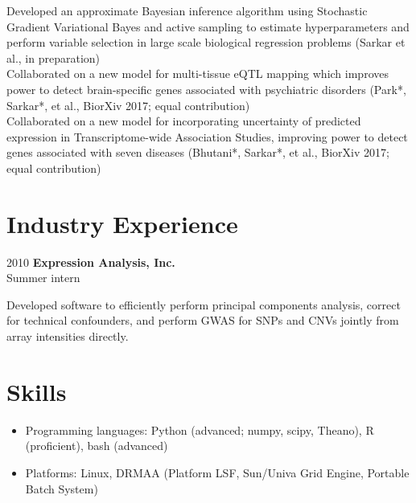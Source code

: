 \documentclass{article}
\begin{document}
Developed an approximate Bayesian inference algorithm using Stochastic
Gradient Variational Bayes and active sampling to estimate hyperparameters
and perform variable selection in large scale biological regression problems
(Sarkar et al., in preparation)\\

Collaborated on a new model for multi-tissue eQTL mapping which improves power
to detect brain-specific genes associated with psychiatric disorders (Park*,
Sarkar*, et al., BiorXiv 2017; equal contribution)\\

Collaborated on a new model for incorporating uncertainty of predicted
expression in Transcriptome-wide Association Studies, improving power to detect
genes associated with seven diseases (Bhutani*, Sarkar*, et al., BiorXiv 2017;
equal contribution)

\section*{Industry Experience}
\begin{hdesc}
\item[2010] \textbf{Expression Analysis, Inc.}\\
  Summer intern
\end{hdesc}

Developed software to efficiently perform principal components analysis,
correct for technical confounders, and perform GWAS for SNPs and CNVs jointly
from array intensities directly.

\section*{Skills}
\begin{itemize}
\item Programming languages: Python (advanced; numpy, scipy, Theano), R
  (proficient), bash (advanced)
\item Platforms: Linux, DRMAA (Platform LSF, Sun/Univa Grid Engine, Portable
  Batch System)
\end{itemize}
\end{document}
